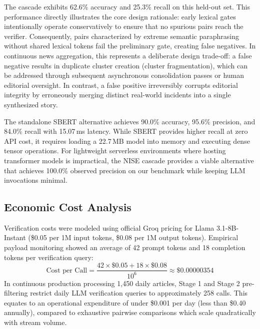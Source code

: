 \documentclass[conference]{IEEEtran}
\begin{document}
The cascade exhibits 62.6\% accuracy and 25.3\% recall on this held-out set.
This performance directly illustrates the core design rationale: early lexical gates intentionally operate conservatively to ensure that no spurious pairs reach the verifier.
Consequently, pairs characterized by extreme semantic paraphrasing without shared lexical tokens fail the preliminary gate, creating false negatives.
In continuous news aggregation, this represents a deliberate design trade-off: a false negative results in duplicate cluster creation (cluster fragmentation), which can be addressed through subsequent asynchronous consolidation passes or human editorial oversight.
In contrast, a false positive irreversibly corrupts editorial integrity by erroneously merging distinct real-world incidents into a single synthesized story.

The standalone SBERT alternative achieves 90.0\% accuracy, 95.6\% precision, and 84.0\% recall with 15.07\,ms latency.
While SBERT provides higher recall at zero API cost, it requires loading a 22.7\,MB model into memory and executing dense tensor operations.
For lightweight serverless environments where hosting transformer models is impractical, the NISE cascade provides a viable alternative that achieves 100.0\% observed precision on our benchmark while keeping LLM invocations minimal.

\subsection{Economic Cost Analysis}
Verification costs were modeled using official Groq pricing for Llama 3.1-8B-Instant (\$0.05 per 1M input tokens, \$0.08 per 1M output tokens).
Empirical payload monitoring showed an average of 42 prompt tokens and 18 completion tokens per verification query:
\begin{equation}
\text{Cost per Call} = \frac{42 \times \$0.05 + 18 \times \$0.08}{10^6} \approx \$0.00000354
\label{eq:cost}
\end{equation}
In continuous production processing 1,450 daily articles, Stage 1 and Stage 2 pre-filtering restrict daily LLM verification queries to approximately 258 calls.
This equates to an operational expenditure of under \$0.001 per day (less than \$0.40 annually), compared to exhaustive pairwise comparisons which scale quadratically with stream volume.
\end{document}
